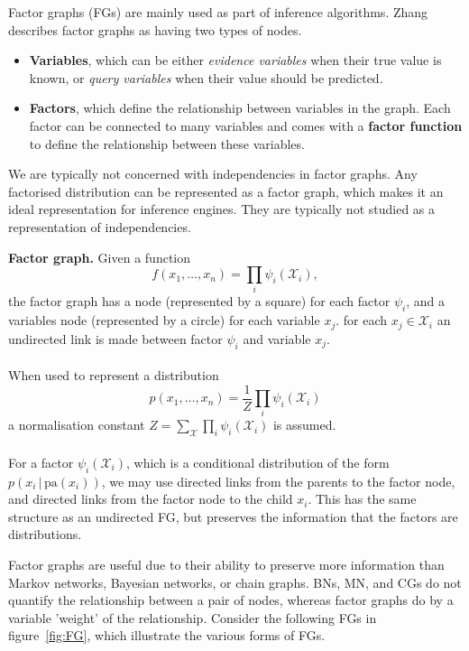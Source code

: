 \documentclass{article}
\begin{document}
Factor graphs (FGs) are mainly used as part of inference algorithms. Zhang~\cite{Zhang2015DeepDiveAD} describes factor graphs as having two types of nodes. 
\begin{itemize}
    \item \textbf{Variables}, which can be either \textit{evidence variables} when their true value is known, or \textit{query variables} when their value should be predicted. 
    \item \textbf{Factors}, which define the relationship between variables in the graph. Each factor can be connected to many variables and comes with a \textbf{factor function} to define the relationship between these variables. 
\end{itemize}
\noindent We are typically not concerned with independencies in factor graphs. Any factorised distribution can be represented as a factor graph, which makes it an ideal representation for inference engines. They are typically not studied as a representation of independencies.
\\
\begin{theorem}
    \textbf{Factor graph.} Given a function 
    $$
        f(x_1, \dots, x_n) = \prod_i \psi_i(\mathcal{X}_i),
    $$
    the factor graph has a node (represented by a square) for each factor $\psi_i$, and a variables node (represented by a circle) for each variable $x_j$. for each $x_j \in \mathcal{X}_i$ an undirected link is made between factor $\psi_i$ and variable $x_j$. 
    \\\\
    When used to represent a distribution
    $$
        p(x_1, \dots, x_n) = \frac{1}{Z} \prod_i \psi_i(\mathcal{X}_i)
    $$
    a normalisation constant $Z = \sum_\mathcal{X} \prod_i \psi_i(\mathcal{X}_i)$ is assumed. 
    \\\\
    For a factor $\psi_i(\mathcal{X}_i)$, which is a conditional distribution of the form $p(x_i \,|\, \text{pa}(x_i))$, we may use directed links from the parents to the factor node, and directed links from the factor node to the child $x_i$. This has the same structure as an undirected FG, but preserves the information that the factors are distributions. 
\end{theorem}

\noindent Factor graphs are useful due to their ability to preserve more information than Markov networks, Bayesian networks, or chain graphs. BNs, MN, and CGs do not quantify the relationship between a pair of nodes, whereas factor graphs do by a variable 'weight' of the relationship. Consider the following FGs in figure~\ref{fig:FG}, which illustrate the various forms of FGs. 
\end{document}
